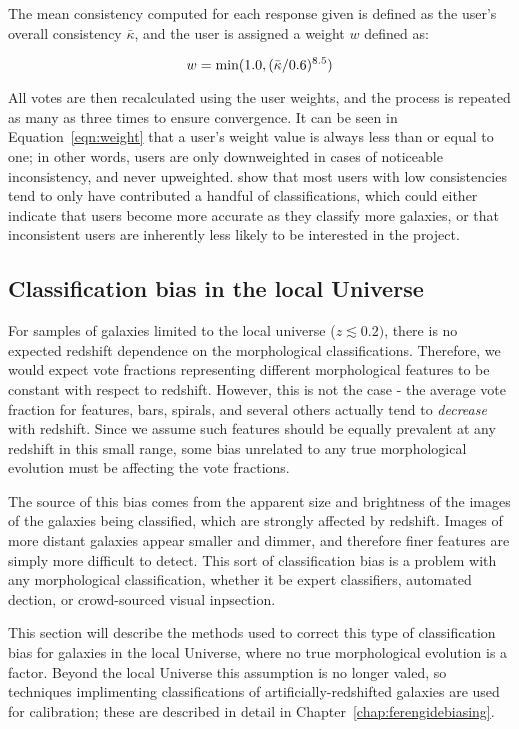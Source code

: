 The mean consistency computed for each response given is defined as the user's overall consistency $\bar{\kappa}$, and the user is assigned a weight $w$ defined as:

\begin{equation}
w = \rm min (1.0,(\bar{\kappa}/0.6)^{8.5})
\label{eqn:weight}
\end{equation}

All votes are then recalculated using the user weights, and the process is repeated as many as three times to ensure convergence. It can be seen in Equation~\ref{eqn:weight} that a user's weight value is always less than or equal to one; in other words, users are only downweighted in cases of noticeable inconsistency, and never upweighted. \citet{Willett2013} show that most users with low consistencies tend to only have contributed a handful of classifications, which could either indicate that users become more accurate as they classify more galaxies, or that inconsistent users are inherently less likely to be interested in the project. 

 
\subsection{Classification bias in the local Universe}

For samples of galaxies limited to the local universe ($z\lesssim0.2)$, there is no expected redshift dependence on the morphological classifications. Therefore, we would expect vote fractions representing different morphological features to be constant with respect to redshift. However, this is not the case - the average vote fraction for features, bars, spirals, and several others actually tend to \emph{decrease} with redshift. Since we assume such features should be equally prevalent at any redshift in this small range, some bias unrelated to any true morphological evolution must be affecting the vote fractions. 

The source of this bias comes from the apparent size and brightness of the images of the galaxies being classified, which are strongly affected by redshift. Images of more distant galaxies appear smaller and dimmer, and therefore finer features are simply more difficult to detect. This sort of classification bias is a problem with any morphological classification, whether it be expert classifiers, automated dection, or crowd-sourced visual inpsection.

This section will describe the methods used to correct this type of classification bias for galaxies in the local Universe, where no true morphological evolution is a factor. Beyond the local Universe this assumption is no longer valed, so techniques implimenting classifications of artificially-redshifted galaxies are used for calibration; these are described in detail in Chapter~\ref{chap:ferengidebiasing}. 

